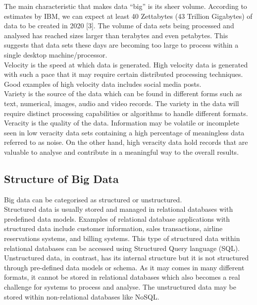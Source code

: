 \documentclass[11pt]{book}
\begin{document}
The main characteristic that makes data “big” is its sheer volume. According to estimates by IBM, we can expect at least 40 Zettabytes (43 Trillion Gigabytes) of data to be created in 2020 [3]. The volume of data sets being processed and analysed has reached sizes larger than terabytes and even petabytes. This suggests that data sets these days are becoming too large to process within a single desktop machine/processor. \\

Velocity is the speed at which data is generated. High velocity data is generated with such a pace that it may require certain distributed processing techniques. Good examples of high velocity data includes social media posts.\\

Variety is the source of the data which can be found in different forms such as text, numerical, images, audio and video records. The variety in the data will require distinct processing capabilities or algorithms to handle different formats. \\

Veracity is the quality of the data. Information may be volatile or incomplete seen in low veracity data sets containing a high percentage of meaningless data referred to as noise. On the other hand, high veracity data hold records that are valuable to analyse and contribute in a meaningful way to the overall results.

\subsection{Structure of Big Data} 

Big data can be categorised as structured or unstructured.\\
 
Structured data is usually stored and managed in relational databases with predefined data models. Examples of relational database applications with structured data include customer information, sales transactions, airline reservations systems, and billing systems. This type of structured data within relational databases can be accessed using Structured Query language (SQL).\\
 
Unstructured data, in contrast, has its internal structure but it is not structured through pre-defined data models or schema. As it may comes in many different formats, it cannot be stored in relational databases which also becomes a real challenge for systems to process and analyse. The unstructured data may be stored within non-relational databases like NoSQL.
\end{document}
